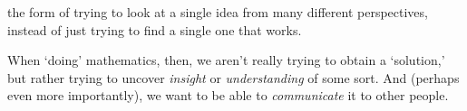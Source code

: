 \documentclass[10pt]{article}
\theoremstyle{definition}
\begin{document}
{\begin{enumerate}
  the form of trying to look at a single idea from many different
  perspectives, instead of just trying to find a single one that
  works.
\end{enumerate}
When `doing' mathematics, then, we aren't really trying to obtain a
`solution,' but rather trying to uncover \emph{insight} or
\emph{understanding} of some sort.
And (perhaps even more importantly), we want to be able to
\emph{communicate} it to other people.

}
\end{document}
